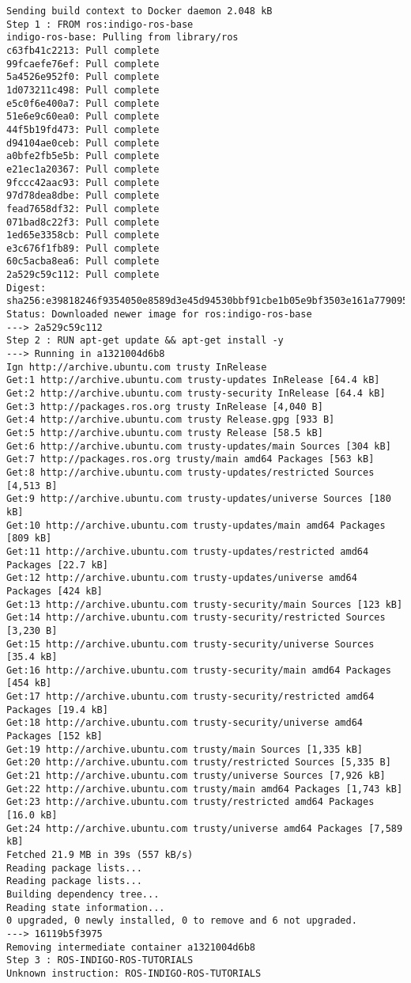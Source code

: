 {	\begin{lstlisting}[style=consola]
Sending build context to Docker daemon 2.048 kB
Step 1 : FROM ros:indigo-ros-base
indigo-ros-base: Pulling from library/ros
c63fb41c2213: Pull complete 
99fcaefe76ef: Pull complete 
5a4526e952f0: Pull complete 
1d073211c498: Pull complete 
e5c0f6e400a7: Pull complete 
51e6e9c60ea0: Pull complete 
44f5b19fd473: Pull complete 
d94104ae0ceb: Pull complete 
a0bfe2fb5e5b: Pull complete 
e21ec1a20367: Pull complete 
9fccc42aac93: Pull complete 
97d78dea8dbe: Pull complete 
fead7658df32: Pull complete 
071bad8c22f3: Pull complete 
1ed65e3358cb: Pull complete 
e3c676f1fb89: Pull complete 
60c5acba8ea6: Pull complete 
2a529c59c112: Pull complete 
Digest: sha256:e39818246f9354050e8589d3e45d94530bbf91cbe1b05e9bf3503e161a779095
Status: Downloaded newer image for ros:indigo-ros-base
---> 2a529c59c112
Step 2 : RUN apt-get update && apt-get install -y
---> Running in a1321004d6b8
Ign http://archive.ubuntu.com trusty InRelease
Get:1 http://archive.ubuntu.com trusty-updates InRelease [64.4 kB]
Get:2 http://archive.ubuntu.com trusty-security InRelease [64.4 kB]
Get:3 http://packages.ros.org trusty InRelease [4,040 B]
Get:4 http://archive.ubuntu.com trusty Release.gpg [933 B]
Get:5 http://archive.ubuntu.com trusty Release [58.5 kB]
Get:6 http://archive.ubuntu.com trusty-updates/main Sources [304 kB]
Get:7 http://packages.ros.org trusty/main amd64 Packages [563 kB]
Get:8 http://archive.ubuntu.com trusty-updates/restricted Sources [4,513 B]
Get:9 http://archive.ubuntu.com trusty-updates/universe Sources [180 kB]
Get:10 http://archive.ubuntu.com trusty-updates/main amd64 Packages [809 kB]
Get:11 http://archive.ubuntu.com trusty-updates/restricted amd64 Packages [22.7 kB]
Get:12 http://archive.ubuntu.com trusty-updates/universe amd64 Packages [424 kB]
Get:13 http://archive.ubuntu.com trusty-security/main Sources [123 kB]
Get:14 http://archive.ubuntu.com trusty-security/restricted Sources [3,230 B]
Get:15 http://archive.ubuntu.com trusty-security/universe Sources [35.4 kB]
Get:16 http://archive.ubuntu.com trusty-security/main amd64 Packages [454 kB]
Get:17 http://archive.ubuntu.com trusty-security/restricted amd64 Packages [19.4 kB]
Get:18 http://archive.ubuntu.com trusty-security/universe amd64 Packages [152 kB]
Get:19 http://archive.ubuntu.com trusty/main Sources [1,335 kB]
Get:20 http://archive.ubuntu.com trusty/restricted Sources [5,335 B]
Get:21 http://archive.ubuntu.com trusty/universe Sources [7,926 kB]
Get:22 http://archive.ubuntu.com trusty/main amd64 Packages [1,743 kB]
Get:23 http://archive.ubuntu.com trusty/restricted amd64 Packages [16.0 kB]
Get:24 http://archive.ubuntu.com trusty/universe amd64 Packages [7,589 kB]
Fetched 21.9 MB in 39s (557 kB/s)
Reading package lists...
Reading package lists...
Building dependency tree...
Reading state information...
0 upgraded, 0 newly installed, 0 to remove and 6 not upgraded.
---> 16119b5f3975
Removing intermediate container a1321004d6b8
Step 3 : ROS-INDIGO-ROS-TUTORIALS 
Unknown instruction: ROS-INDIGO-ROS-TUTORIALS
	\end{lstlisting}

}

